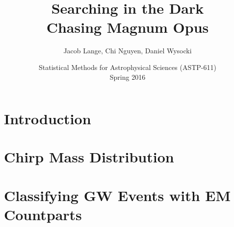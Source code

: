 \documentclass[DIV=calc, paper=a4, 11pt, twocolumn]{scrartcl}
\title{
Searching in the Dark
\\
Chasing Magnum Opus
}
\author{
  Jacob Lange, Chi Nguyen, Daniel Wysocki
}
\date{
  Statistical Methods for Astrophysical Sciences (ASTP-611)
  \\
  Spring 2016
}
\begin{document}
\maketitle

\thispagestyle{fancy} %

\section*{Introduction}
\label{sec:intro}



\section{Chirp Mass Distribution}
\label{sec:dist}





\section{Classifying GW Events with EM Countparts}
\label{sec:classifier}




\printbibliography
\end{document}
